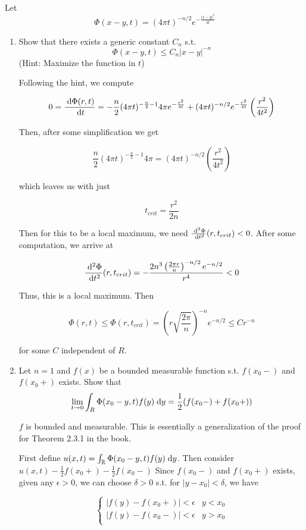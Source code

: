 Let
$$
\Phi(x - y, t) = (4 \pi t)^{-n / 2} e^{-\frac{|x - y|^2}{4t}}
$$
\begin{enumerate}
\item Show that there exists a generic constant $C_n$ s.t.
  $$
  \Phi(x - y, t) \leq C_n |x - y|^{-n}
  $$
  (Hint: Maximize the function in $t$)

  Following the hint, we compute

  $$
  0 = \frac{\;\mathrm{d}\Phi(r, t)}{\;\mathrm{d}t}
    = - \frac{n}{2} (4 \pi t)^{-\frac{n}{2} - 1} 4 \pi e^{-\frac{r^2}{4 t}} + (4 \pi t)^{-n / 2} e^{-\frac{r^2}{4 t}} \left( \frac{r^2}{4 t^2} \right)
  $$

  Then, after some simplification we get

  $$
  \frac{n}{2} (4 \pi t)^{-\frac{n}{2} - 1} 4 \pi = (4 \pi t)^{-n / 2} \left( \frac{r^2}{4 t^2} \right)
  $$

  which leaves us with just

  $$
  t_{crit} = \frac{r^2}{2 n}
  $$

  Then for this to be a local maximum, we need $\frac{\;\mathrm{d}^{2} \Phi}{\;\mathrm{d}t^{2}}(r, t_{crit}) < 0$.
  After some computation, we arrive at

  $$
  \frac{\;\mathrm{d}^{2} \Phi}{\;\mathrm{d}t^{2}}(r, t_{crit}) = -\frac{2 n^3 \left( \frac{2 \pi r}{n} \right)^{-n / 2} e^{-n / 2}}{r^4} < 0
  $$

  Thus, this is a local maximum. Then

  $$
  \Phi(r, t) \leq \Phi(r, t_{crit}) = \left( r \sqrt{\frac{2 \pi}{n}} \right)^{-n} e^{-n / 2} \leq C r^{-n}
  $$

  for some $C$ independent of $R$.

\item
  Let $n = 1$ and $f(x)$ be a bounded measurable function s.t. $f(x_0 -)$ and $f(x_0+)$ exists.
  Show that
  $$
  \lim \limits_{t \rightarrow 0} \int_R \Phi(x_0  - y, t) f(y) \;\mathrm{d}y = \frac{1}{2} (f(x_0-) + f(x_0+))
  $$

  $f$ is bounded and measurable.
  This is essentially a generalization of the proof for Theorem 2.3.1 in the book.

  First define $u(x, t) = \int_{\mathbb{R}} \Phi(x_0 - y, t) f(y) \;\mathrm{d}y$.
  Then consider $u(x, t) - \frac{1}{2} f(x_0+) - \frac{1}{2} f(x_0-)$
  Since $f(x_0-)$ and $f(x_0+)$ exists, given any $\epsilon > 0$, we can choose $\delta > 0$ s.t.
  for $|y - x_0| < \delta$, we have

  $$
  \begin{cases}
    |f(y) - f(x_0+)| < \epsilon & y < x_0\\
    |f(y) - f(x_0-)| < \epsilon & y > x_0\\
  \end{cases}
  $$


\end{enumerate}
